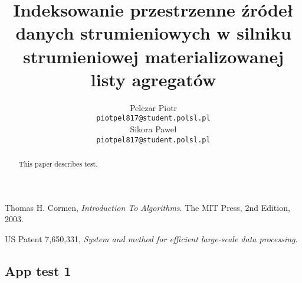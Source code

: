 \documentclass[12pt]{article}
\title{Indeksowanie przestrzenne źródeł danych strumieniowych w silniku strumieniowej materializowanej listy agregatów}
\author{
	  Pelczar Piotr\\
	  \small{\texttt{piotpel817@student.polsl.pl}}
	  \\[3ex]
	  Sikora Paweł\\
	  \small{\texttt{piotpel817@student.polsl.pl}}
	}
\date{\displaydate{date}}
\begin{document}
\maketitle
 
\begin{abstract}
This paper describes test.
\end{abstract}

\renewcommand{\contentsname}{Contents}

\newpage
\tableofcontents

\newpage











\newpage
\begin{thebibliography}{9}

  Thomas H. Cormen,
  \emph{Introduction To Algorithms}.
  The MIT Press,
  2nd Edition,
  2003.

  US Patent 7,650,331,
  \emph{System and method for efficient large-scale data processing}.

\end{thebibliography}

\begin{appendices}
	\section{App test 1}
	\label{app:appTest1}

\end{appendices}
\end{document}
